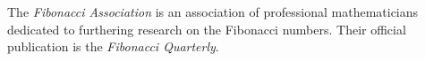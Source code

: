 \documentclass[12pt]{article}
\begin{document}
The {\em Fibonacci Association} is an association of professional mathematicians dedicated to furthering research on the Fibonacci numbers. Their official publication is the {\it Fibonacci Quarterly}.


\end{document}
